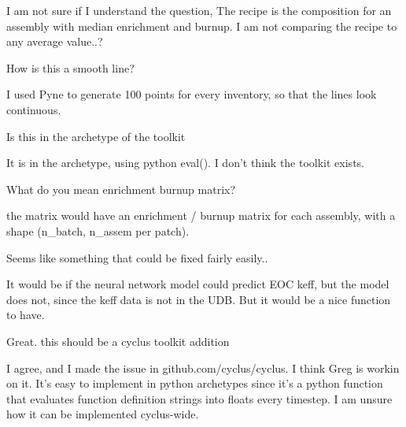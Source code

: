 \documentclass[answers,11pt]{exam}
\begin{document}
\begin{questions}
        \begin{solution}
        I am not sure if I understand the question,
        The recipe is the composition for an assembly with median
        enrichment and burnup. I am not comparing the recipe to
        any average value..? 
        \end{solution}

        \question
        How is this a smooth line?

        \begin{solution}
        I used Pyne to generate 100 points for every inventory,
        so that the lines look continuous.
        \end{solution}


        \question
        Is this in the archetype of the toolkit

        \begin{solution}
        It is in the archetype, using python eval().
        I don't think the toolkit exists.
        \end{solution}

        \question
        What do you mean enrichment burnup matrix?

        \begin{solution}
        the matrix would have an enrichment / burnup
        matrix for each assembly, with a shape (n\_batch, n\_assem per patch).
        \end{solution}

        \question
        Seems like something that could be fixed fairly easily..

        \begin{solution}
        It would be if the neural network model could predict EOC keff,
        but the model does not, since the keff data is not in the UDB.
        But it would be a nice function to have.
        \end{solution}

        \question
        Great. this should be a cyclus toolkit addition

        \begin{solution}
        I agree, and I made the issue in github.com/cyclus/cyclus.
        I think Greg is workin on it. It's easy to implement in
        python archetypes since it's a python function that evaluates
        function definition strings into floats every timestep. I am
        unsure how it can be implemented cyclus-wide.
        \end{solution}



\end{questions}
\end{document}
